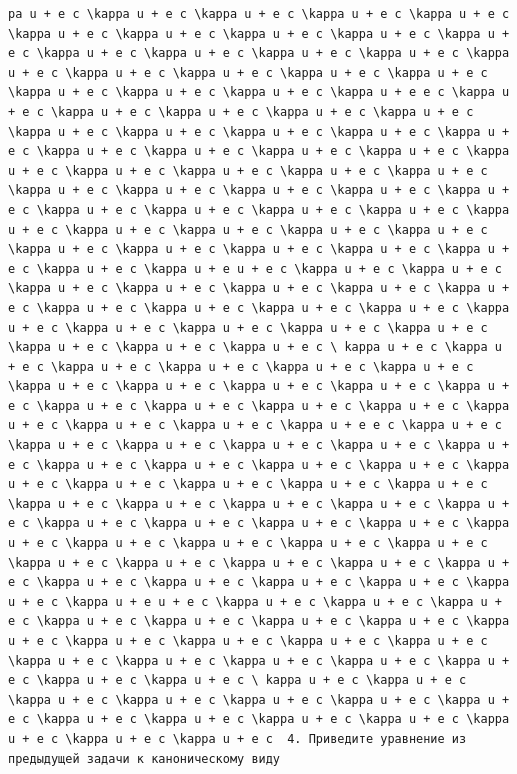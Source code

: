 \documentclass[
  ukrainian,
]{article}
\begin{document}
\begin{verbatim}
pa u + e c \kappa u + e c \kappa u + e c \kappa u + e c \kappa u + e c \kappa u + e c \kappa u + e c \kappa u + e c \kappa u + e c \kappa u + e c \kappa u + e c \kappa u + e c \kappa u + e c \kappa u + e c \kappa u + e c \kappa u + e c \kappa u + e c \kappa u + e c \kappa u + e c \kappa u + e c \kappa u + e c \kappa u + e c \kappa u + e e c \kappa u + e c \kappa u + e c \kappa u + e c \kappa u + e c \kappa u + e c \kappa u + e c \kappa u + e c \kappa u + e c \kappa u + e c \kappa u + e c \kappa u + e c \kappa u + e c \kappa u + e c \kappa u + e c \kappa u + e c \kappa u + e c \kappa u + e c \kappa u + e c \kappa u + e c \kappa u + e c \kappa u + e c \kappa u + e c \kappa u + e c \kappa u + e c \kappa u + e c \kappa u + e c \kappa u + e c \kappa u + e c \kappa u + e c \kappa u + e c \kappa u + e c \kappa u + e c \kappa u + e c \kappa u + e c \kappa u + e c \kappa u + e c \kappa u + e c \kappa u + e c \kappa u + e c \kappa u + e u + e c \kappa u + e c \kappa u + e c \kappa u + e c \kappa u + e c \kappa u + e c \kappa u + e c \kappa u + e c \kappa u + e c \kappa u + e c \kappa u + e c \kappa u + e c \kappa u + e c \kappa u + e c \kappa u + e c \kappa u + e c \kappa u + e c \kappa u + e c \kappa u + e c \kappa u + e c \ kappa u + e c \kappa u + e c \kappa u + e c \kappa u + e c \kappa u + e c \kappa u + e c \kappa u + e c \kappa u + e c \kappa u + e c \kappa u + e c \kappa u + e c \kappa u + e c \kappa u + e c \kappa u + e c \kappa u + e c \kappa u + e c \kappa u + e c \kappa u + e c \kappa u + e e c \kappa u + e c \kappa u + e c \kappa u + e c \kappa u + e c \kappa u + e c \kappa u + e c \kappa u + e c \kappa u + e c \kappa u + e c \kappa u + e c \kappa u + e c \kappa u + e c \kappa u + e c \kappa u + e c \kappa u + e c \kappa u + e c \kappa u + e c \kappa u + e c \kappa u + e c \kappa u + e c \kappa u + e c \kappa u + e c \kappa u + e c \kappa u + e c \kappa u + e c \kappa u + e c \kappa u + e c \kappa u + e c \kappa u + e c \kappa u + e c \kappa u + e c \kappa u + e c \kappa u + e c \kappa u + e c \kappa u + e c \kappa u + e c \kappa u + e c \kappa u + e c \kappa u + e c \kappa u + e u + e c \kappa u + e c \kappa u + e c \kappa u + e c \kappa u + e c \kappa u + e c \kappa u + e c \kappa u + e c \kappa u + e c \kappa u + e c \kappa u + e c \kappa u + e c \kappa u + e c \kappa u + e c \kappa u + e c \kappa u + e c \kappa u + e c \kappa u + e c \kappa u + e c \kappa u + e c \ kappa u + e c \kappa u + e c \kappa u + e c \kappa u + e c \kappa u + e c \kappa u + e c \kappa u + e c \kappa u + e c \kappa u + e c \kappa u + e c \kappa u + e c \kappa u + e c \kappa u + e c \kappa u + e c  4. Приведите уравнение из предыдущей задачи к каноническому виду
\end{verbatim}
\end{document}
